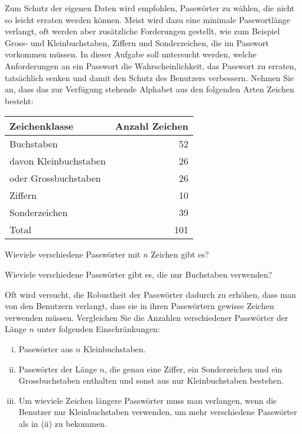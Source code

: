 Zum Schutz der eigenen Daten wird empfohlen, Passwörter zu wählen,
die nicht so leicht erraten werden können.
Meist wird dazu eine minimale Passwortlänge verlangt, oft werden
aber zusätzliche Forderungen gestellt, wie zum Beispiel Gross-
und Kleinbuchstaben, Ziffern und Sonderzeichen, die im Passwort
vorkommen müssen.
In dieser Aufgabe soll untersucht werden, welche Anforderungen an
ein Passwort die Wahrscheinlichkeit, das Passwort zu erraten, 
tatsächlich senken und damit den Schutz des Benutzers verbessern.
Nehmen Sie an, dass das zur Verfügung stehende Alphabet aus den
folgenden Arten Zeichen besteht:
\begin{center}
\begin{tabular}{|lr|}
\hline
Zeichenklasse                 & Anzahl Zeichen \\
\hline
Buchstaben                    &             52 \\
\qquad davon Kleinbuchstaben  &             26 \\
\qquad oder Grossbuchstaben   &             26 \\
Ziffern                       &             10 \\
Sonderzeichen                 &             39 \\
\hline
Total                         &            101 \\
\hline
\end{tabular}
\end{center}
\begin{teilaufgaben}
\item
Wieviele verschiedene Passwörter mit $n$ Zeichen gibt es?
\item
Wieviele verschiedene Passwörter gibt es, die nur Buchstaben verwenden?
\item
Oft wird versucht, die Robustheit der Passwörter dadurch zu erhöhen, dass
man von den Benutzern verlangt, dass sie in ihren Passwörtern gewisse
Zeichen verwenden müssen.
Vergleichen Sie die Anzahlen verschiedener Passwörter der Länge $n$
unter folgenden Einschränkungen:
\begin{enumerate}[i)]
\item
Passwörter aus $n$ Kleinbuchstaben.
\item
Passwörter der Länge $n$, die genau
eine Ziffer, ein Sonderzeichen und ein Grossbuchstaben enthalten
und sonst aus nur Kleinbuchstaben bestehen.
\item
Um wieviele Zeichen längere Passwörter muss man verlangen, wenn die
Benutzer nur Kleinbuchstaben verwenden, um mehr verschiedene
Passwörter als in (ii) zu bekommen.
\end{enumerate}
\end{teilaufgaben}


